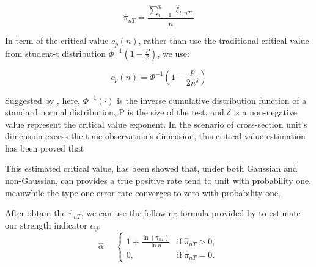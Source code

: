 \documentclass[12pt]{article}
\begin{document}
\[  \hat{\pi}_{nT} = \frac{\sum_{i=1}^n \hat{\ell}_{i,nT}}{n} \tag{4} \label{pi_function} \]


In term of the critical value $c_p(n)$, rather than use the traditional critical value from student-t distribution $\Phi^{-1}(1-\frac{P}{2})$, we use:

\[   c_p(n) = \Phi^{-1}(1 - \frac{p}{2n^\delta})   \tag{5} \label{critical_value_function} \]

Suggested by , here, $\Phi^{-1}(\cdot)$ is the inverse cumulative distribution function of a standard normal distribution, P is the size of the test, and $\delta$ is a non-negative value represent the critical value exponent. 
In the scenario of cross-section unit's dimension excess the time observation's dimension, this critical value estimation has been proved that 


This estimated critical value, has been showed that, under both Gaussian and non-Gaussian,  can provides a true positive rate tend to unit with probability one, meanwhile the type-one error rate converges to zero with probability one.

After obtain the $\hat{\pi}_{nT}$, we can use the following formula provided by  to estimate our strength indicator $\alpha_j$:
\[ \hat{\alpha} = \begin{cases}
1+\frac{\ln(\hat{\pi}_{nT})}{\ln n} & \text{if}\; \hat{\pi}_{nT} > 0,\\
0, & \text{if}\; \hat{\pi}_{nT} = 0.
\end{cases} \]
\end{document}
